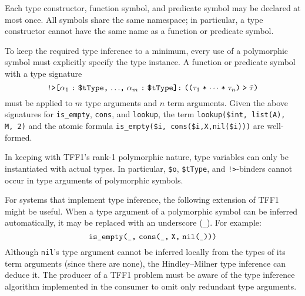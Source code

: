 Each type constructor, function symbol, and predicate symbol may be declared at
most once.
All symbols share the same namespace; in
particular, a type constructor cannot have the same name as a function or
predicate symbol.


 To keep the required type
inference to a minimum, every use of a polymorphic symbol must explicitly
specify the type instance. A function or predicate symbol with a type signature
\[\hbox{{\tt !>[$\alpha_1$\;:\;\$tType,\;${\dots}$,\;$\alpha_m$\;:\;\$tType]:\;%
(($\tau_1$\;*\;${\cdots}$\;*\;$\tau_n$)\;>\;$\tilde \tau$)}}\]
must be applied to $m$ type arguments and $n$ term arguments. Given the above
signatures for {\tt is\_empty}, {\tt cons}, and {\tt lookup}, the term
\hbox{\tt lookup(\$int,\;\,list(A),\;\,M,\;\,2)}
and the atomic formula
\hbox{\tt is\_empty(\$i,\;\,cons(\$i,\;X,\;nil(\$i)))}
are well-formed.

In keeping with TFF1's rank-1 polymorphic nature, type variables can only be
instantiated with actual types. In particular, \verb+$o+, \verb+$tType+,
and {\tt !>}-binders cannot occur in type arguments of polymorphic symbols.

For systems that implement type inference, the following extension
of TFF1 might be useful. When a type argument of
a polymorphic symbol can be inferred automatically, it may be
replaced with an underscore ({\tt \_}). For example:
\[\hbox{{\tt is\_empty(\_,} {\tt cons(\_,\;X,\;nil(\_)))}}\]
Although {\tt nil}'s type argument cannot be inferred locally from the types of
its term arguments (since there are none), the Hindley--Milner type inference
can deduce it. The producer of a TFF1 problem must be aware of the type
inference algorithm implemented in the consumer to omit only redundant type
arguments.

